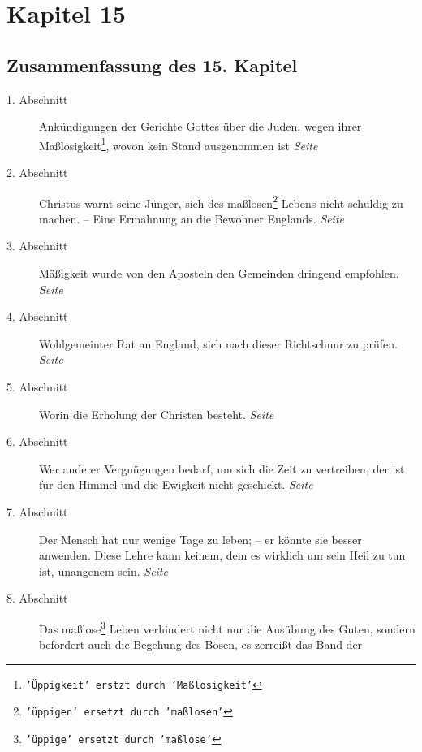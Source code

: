 
\chapter{Kapitel 15} \label{kap15}

\section{Zusammenfassung des 15. Kapitel}

\begin{description}
\item[1. Abschnitt] Ankündigungen der Gerichte Gottes über die Juden, wegen
ihrer Maßlosigkeit\footnote{\texttt{'Üppigkeit' erstzt durch 'Maßlosigkeit'}},
wovon
kein Stand ausgenommen ist
\dotfill \textit{Seite~\pageref{kap15_ab1}}\\
\item[2. Abschnitt] Christus warnt seine Jünger, sich des
maßlosen\footnote{\texttt{'üppigen' ersetzt durch 'maßlosen'}} Lebens nicht
schuldig zu machen. -- Eine Ermahnung an die Bewohner Englands.
\dotfill \textit{Seite~\pageref{kap15_ab2}}\\
\item[3. Abschnitt] Mäßigkeit wurde von den Aposteln den Gemeinden dringend
empfohlen.
\dotfill \textit{Seite~\pageref{kap15_ab3}}\\
\item[4. Abschnitt] Wohlgemeinter Rat an England, sich nach dieser Richtschnur
zu prüfen.
\dotfill \textit{Seite~\pageref{kap15_ab4}}\\
\item[5. Abschnitt] Worin die Erholung der Christen besteht.
\dotfill \textit{Seite~\pageref{kap15_ab5}}\\
\item[6. Abschnitt] Wer anderer Vergnügungen bedarf, um sich die Zeit zu
vertreiben, der ist für den Himmel und die Ewigkeit nicht geschickt.
\dotfill \textit{Seite~\pageref{kap15_ab6}}\\
\item[7. Abschnitt] Der Mensch hat nur wenige Tage zu leben; -- er könnte sie
besser anwenden. Diese Lehre kann keinem, dem es wirklich um sein Heil zu tun
ist, unangenem sein.
\dotfill \textit{Seite~\pageref{kap15_ab6}}\\
\item[8. Abschnitt] Das maßlose\footnote{\texttt{'üppige' ersetzt durch
'maßlose'}}
Leben verhindert nicht nur die Ausübung des
Guten, sondern befördert auch die Begehung des Bösen, es zerreißt das Band der

\end{description}

